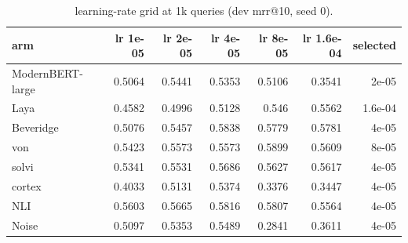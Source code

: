 \begin{table}[t]
\centering
\caption{learning-rate grid at 1k queries (dev mrr@10, seed 0).}
\begin{tabular}{l r r r r r r}
\toprule
arm & lr 1e-05 & lr 2e-05 & lr 4e-05 & lr 8e-05 & lr 1.6e-04 & selected \\
\midrule
ModernBERT-large & 0.5064 & 0.5441 & 0.5353 & 0.5106 & 0.3541 & 2e-05 \\
Laya & 0.4582 & 0.4996 & 0.5128 & 0.546 & 0.5562 & 1.6e-04 \\
Beveridge & 0.5076 & 0.5457 & 0.5838 & 0.5779 & 0.5781 & 4e-05 \\
von & 0.5423 & 0.5573 & 0.5573 & 0.5899 & 0.5609 & 8e-05 \\
solvi & 0.5341 & 0.5531 & 0.5686 & 0.5627 & 0.5617 & 4e-05 \\
cortex & 0.4033 & 0.5131 & 0.5374 & 0.3376 & 0.3447 & 4e-05 \\
NLI & 0.5603 & 0.5665 & 0.5816 & 0.5807 & 0.5564 & 4e-05 \\
Noise & 0.5097 & 0.5353 & 0.5489 & 0.2841 & 0.3611 & 4e-05 \\
\bottomrule
\end{tabular}
\end{table}
